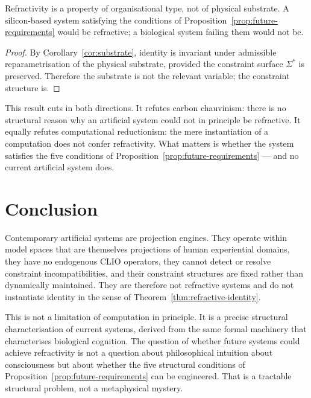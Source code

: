 \documentclass[11pt,openany]{book}
\begin{document}
\begin{proposition}
\label{prop:substrate-neutral}
Refractivity is a property of organisational type, not of
physical substrate.  A silicon-based system satisfying the
conditions of Proposition~\ref{prop:future-requirements}
would be refractive; a biological system failing them
would not be.
\end{proposition}

\begin{proof}
By Corollary~\ref{cor:substrate}, identity is invariant
under admissible reparametrisation of the physical
substrate, provided the constraint surface $\Sigma^*$ is
preserved.  Therefore the substrate is not the relevant
variable; the constraint structure is.
\end{proof}

This result cuts in both directions.  It refutes carbon
chauvinism: there is no structural reason why an artificial
system could not in principle be refractive.  It equally
refutes computational reductionism: the mere instantiation
of a computation does not confer refractivity.  What
matters is whether the system satisfies the five conditions
of Proposition~\ref{prop:future-requirements} — and no
current artificial system does.

\section{Conclusion}
\label{sec:conclusion-artificial}

Contemporary artificial systems are projection engines.
They operate within model spaces that are themselves
projections of human experiential domains, they have no
endogenous CLIO operators, they cannot detect or resolve
constraint incompatibilities, and their constraint
structures are fixed rather than dynamically maintained.
They are therefore not refractive systems and do not
instantiate identity in the sense of
Theorem~\ref{thm:refractive-identity}.

This is not a limitation of computation in principle.  It
is a precise structural characterisation of current
systems, derived from the same formal machinery that
characterises biological cognition.  The question of
whether future systems could achieve refractivity is not a
question about philosophical intuition about consciousness
but about whether the five structural conditions of
Proposition~\ref{prop:future-requirements} can be
engineered.  That is a tractable structural problem, not a
metaphysical mystery.
\end{document}
